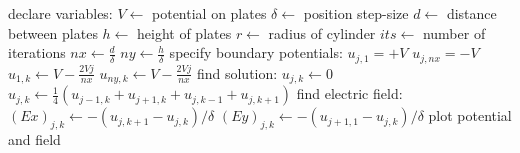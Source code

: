 \documentclass[12pt, a4paper]{article}
\begin{document}
\begin{algorithm}
\begin{algorithmic}[1]
\State declare variables:
\State $V \gets$ potential on plates
\State $\delta \gets$ position step-size
\State $d \gets$ distance between plates
\State $h \gets$ height of plates
\State $r \gets$ radius of cylinder
\State $its \gets$ number of iterations
\State $nx \gets \frac{d}{\delta}$ 
\State $ny \gets \frac{h}{\delta}$ 
\State specify boundary potentials:
   \State $u_{j, 1} = +V$
   \State $u_{j, nx} = -V$
\EndFor
{}
   \State $u_{1, k} \gets V-\frac{2Vj}{nx}$
   \State $u_{ny, k} \gets V-\frac{2Vj}{nx}$
\EndFor
\State find solution:
            \State $u_{j, k} \gets 0$
         \Else
            \State $u_{j,k} \gets \frac{1}{4}(u_{j-1,k}+u_{j+1,k}+u_{j,k-1}+u_{j,k+1})$
         \EndIf
      \EndFor
   \EndFor
\EndFor
\State find electric field:
      \State $(Ex)_{j, k} \gets -\left(u_{j,k+1}-u_{j,k}\right)/\delta$
      \State $(Ey)_{j,k} \gets -\left(u_{j+1,1}-u_{j,k}\right)/\delta$
   \EndFor
\EndFor
\State plot potential and field
\EndProcedure
\end{algorithmic}
\end{algorithm}
\end{document}
